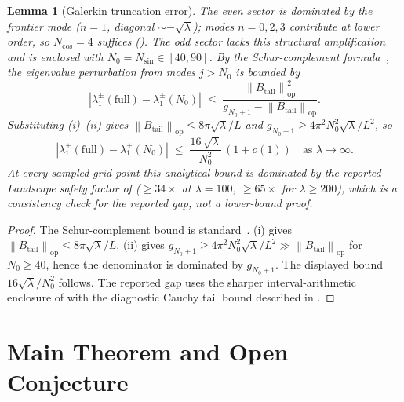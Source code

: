 \documentclass[11pt,a4paper]{article}
\newtheorem{lemma}[lemma]{Lemma}
\theoremstyle{remark}
\theoremstyle{plain}
\newcommand{\norm}[1]{\left\lVert #1 \right\rVert}
\begin{document}
\begin{lemma}[Galerkin truncation error]
\label{lem:galerkin}
The even sector is dominated by the frontier mode ($n=1$, diagonal
$\sim-\sqrt\lambda$); modes $n=0,2,3$ contribute at lower order, so $N_{\cos}=4$
suffices (). The odd sector lacks this structural
amplification and is enclosed with $N_0=N_{\sin}\in[40,90]$. By the
Schur-complement formula~\cite{Kato1966}, the eigenvalue perturbation from
modes $j>N_0$ is bounded by
\[
  |\lambda_1^\pm(\mathrm{full})-\lambda_1^\pm(N_0)|
  \;\leq\;
  \frac{\norm{B_{\mathrm{tail}}}_{\mathrm{op}}^2}{g_{N_0+1}-\norm{B_{\mathrm{tail}}}_{\mathrm{op}}}.
\]
Substituting (i)--(ii) gives
$\norm{B_{\mathrm{tail}}}_{\mathrm{op}}\leq 8\pi\sqrt\lambda/L$ and
$g_{N_0+1}\geq 4\pi^2 N_0^2\sqrt\lambda/L^2$, so
\[
  |\lambda_1^\pm(\mathrm{full})-\lambda_1^\pm(N_0)|
  \;\leq\;
  \frac{16\,\sqrt\lambda}{N_0^2}\,(1+o(1))
  \quad\text{as }\lambda\to\infty.
\]
At every sampled grid point this analytical bound is dominated by the
reported Landscape safety factor of 
($\geq 34\times$ at $\lambda=100$, $\geq 65\times$ for $\lambda\geq 200$),
which is a consistency check for the reported gap, not a lower-bound proof.
\end{lemma}

\begin{proof}
The Schur-complement bound is standard~\cite{Kato1966}.
(i) gives $\norm{B_{\mathrm{tail}}}_{\mathrm{op}}\leq 8\pi\sqrt\lambda/L$.
(ii) gives $g_{N_0+1}\geq 4\pi^2 N_0^2\sqrt\lambda/L^2 \gg \norm{B_{\mathrm{tail}}}_{\mathrm{op}}$
for $N_0\geq 40$, hence the denominator is dominated by $g_{N_0+1}$.
The displayed bound $16\sqrt\lambda/N_0^2$ follows. The reported gap uses the
sharper interval-arithmetic enclosure of \cite[Section~2.9]{GeigerLandscapeII}
with the diagnostic Cauchy tail bound described in .
\end{proof}

\section{Main Theorem and Open Conjecture}
\end{document}
